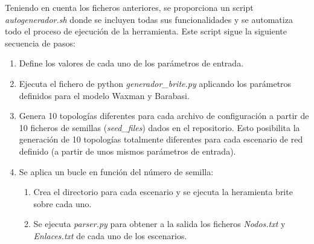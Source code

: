 \vspace{3mm}

Teniendo en cuenta los ficheros anteriores, se proporciona un script \textit{autogenerador.sh} donde se incluyen todas sus funcionalidades y se automatiza todo el proceso de ejecución de la herramienta. Este script sigue la siguiente secuencia de pasos:

\begin{enumerate}
    \item Define los valores de cada uno de los parámetros de entrada.
    \item Ejecuta el fichero de python \textit{generador\_brite.py} aplicando los parámetros definidos para el modelo Waxman y Barabasi.
    \item Genera 10 topologías diferentes para cada archivo de configuración a partir de 10 ficheros de semillas (\textit{seed\_files}) dados en el repositorio. Esto posibilita la generación de 10 topologías totalmente diferentes para cada escenario de red definido (a partir de unos mismos parámetros de entrada). 
    \item Se aplica un bucle en función del número de semilla:
    \begin{enumerate} 
        \item Crea el directorio para cada escenario y se ejecuta la heramienta \gls{brite} sobre cada uno.
        \item Se ejecuta \textit{parser.py} para obtener a la salida los ficheros \textit{Nodos.txt} y \textit{Enlaces.txt} de cada uno de los escenarios.   
    \end{enumerate} 
\end{enumerate}
